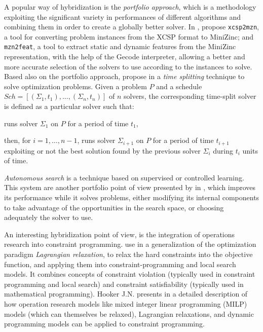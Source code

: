 A popular way of hybridization is the \textit{portfolio approach}, which is a methodology exploiting the significant variety in performances of different algorithms and combining them in order to create a globally better solver. In \cite{Amadini},  propose \texttt{xcsp2mzn}, a tool for converting problem instances from the XCSP format %
to {\sc MiniZinc}; %
and \texttt{mzn2feat}, a tool to extract static and dynamic features from the {\sc MiniZinc} representation, with the help of the {\sc Gecode} interpreter, allowing a better and more accurate selection of the solvers to use according to the instances to solve. %
Based also on the portfolio approach,  propose in \cite{Amadini2014} a \textit{time splitting} technique to solve optimization problems. Given a problem $P$ and a schedule $Sch = \left[(\Sigma_1, t_1),\dots,(\Sigma_n, t_n)\right]$ of $n$ solvers, the corresponding time-split solver is defined as a particular solver such that:  
\begin{inparaenum} %
\item runs solver $\Sigma_1$ on $P$ for a period of time $t_1$, 
\item then, for $i = 1,\dots, n-1$, runs solver $\Sigma_{i+1}$ on $P$ for a period of time $t_{i+1}$ exploiting or not the best solution found by  the previous solver $\Sigma_i$ during $t_i$ units of time.
\end{inparaenum}%
{\it Autonomous search} is a technique based on supervised or controlled learning. This system are another portfolio point of view presented by  in \cite{WhatIsAuto}, which improves its performance while it solves problems, either modifying its internal components to take advantage of the opportunities in the search space, or choosing adequately the solver to use.

An interesting hybridization point of view, is the integration of operations research into constraint programming.  use in \cite{Fontaine2014} a generalization of the optimization paradigm \textit{Lagrangian relaxation}, to relax the hard constraints into the objective function, and applying them into constraint-programming and local search models. It combines concepts of constraint violation (typically used in constraint programming and local search) and constraint satisfiability (typically used in mathematical programming). Hooker J.N. presents in \cite{Hooker2006} a detailed description of how operation research models like mixed integer linear programming (MILP) models (which can themselves be relaxed), Lagrangian relaxations, and dynamic programming models can be applied to constraint programming. 

